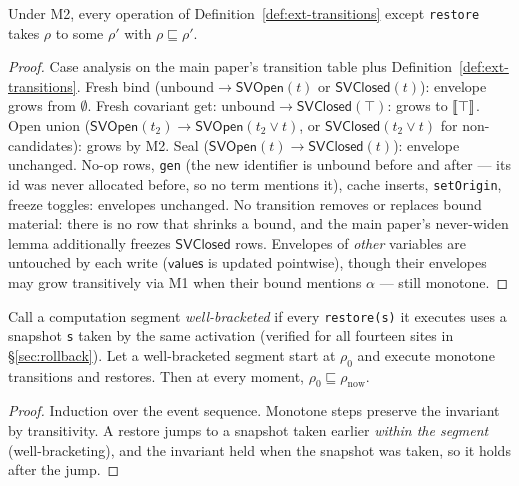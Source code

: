\documentclass[11pt]{article}
\newcommand{\SVOpen}{\mathsf{SVOpen}}
\newcommand{\SVClosed}{\mathsf{SVClosed}}
\newcommand{\stle}{\sqsubseteq}              %
\begin{document}
\begin{lemma}
\label{lem:trans-mono}
Under M2, every operation of Definition~\ref{def:ext-transitions} except
\texttt{restore} takes $\rho$ to some $\rho'$ with $\rho \stle \rho'$.
\end{lemma}
\begin{proof}
Case analysis on the main paper's transition table plus
Definition~\ref{def:ext-transitions}. Fresh bind
($\mathrm{unbound} \to \SVOpen(t)$ or $\SVClosed(t)$): envelope grows from
$\emptyset$. Fresh covariant get: $\mathrm{unbound} \to \SVClosed(\top)$:
grows to $\llbracket \top \rrbracket$. Open union
($\SVOpen(t_2) \to \SVOpen(t_2 \vee t)$, or
$\SVClosed(t_2 \vee t)$ for non-candidates): grows by M2. Seal
($\SVOpen(t) \to \SVClosed(t)$): envelope unchanged. No-op rows,
\texttt{gen} (the new identifier is unbound before and after — its id was
never allocated before, so no term mentions it), cache inserts,
\texttt{setOrigin}, freeze toggles: envelopes unchanged. No transition
removes or replaces bound material: there is no row that shrinks a bound,
and the main paper's never-widen lemma additionally freezes
$\SVClosed$ rows. Envelopes of \emph{other} variables are untouched by
each write ($\mathsf{values}$ is updated pointwise), though their
envelopes may grow transitively via M1 when their bound mentions
$\alpha$ — still monotone.
\end{proof}

\begin{lemma}
\label{lem:restore-safe}
Call a computation segment \emph{well-bracketed} if every
\texttt{restore(s)} it executes uses a snapshot \texttt{s} taken by the
same activation (verified for all fourteen sites in
\S\ref{sec:rollback}). Let a well-bracketed segment start at $\rho_0$ and
execute monotone transitions and restores. Then at every moment,
$\rho_0 \stle \rho_{\mathrm{now}}$.
\end{lemma}
\begin{proof}
Induction over the event sequence. Monotone steps preserve the invariant
by transitivity. A restore jumps to a snapshot taken earlier \emph{within
the segment} (well-bracketing), and the invariant held when the snapshot
was taken, so it holds after the jump.
\end{proof}
\end{document}
